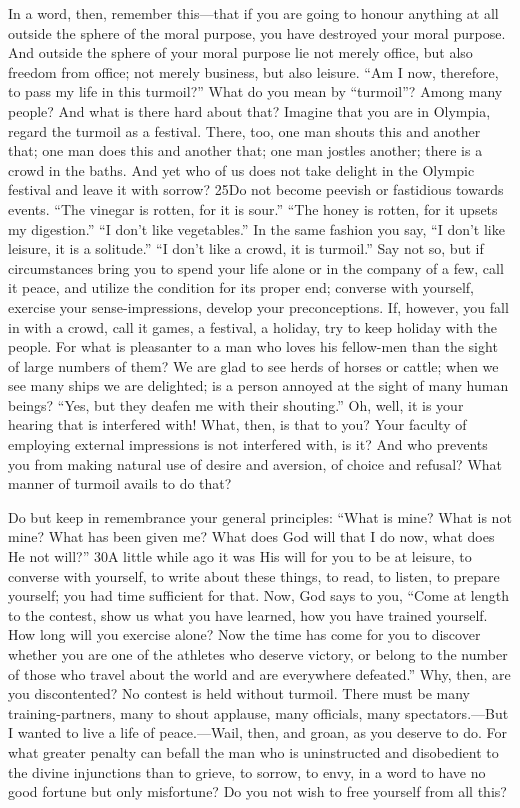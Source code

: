 In a word, then, remember this—that if you are going to honour anything at all outside the sphere of the moral purpose, you have destroyed your moral purpose. And outside the sphere of your moral purpose lie not merely office, but also freedom from office; not merely business, but also leisure. ``Am I now, therefore, to pass my life in this turmoil?'' What do you mean by ``turmoil''? Among many people? And what is there hard about that? Imagine that you are in Olympia, regard the turmoil as a festival. There, too, one man shouts this and another that; one man does this and another that; one man jostles another; there is a crowd in the baths. And yet who of us does not take delight in the Olympic festival and leave it with sorrow? 25Do not become peevish or fastidious towards events. ``The vinegar is rotten, for it is sour.'' ``The honey is rotten, for it upsets my digestion.'' ``I don't like vegetables.'' In the same fashion you say, ``I don't like leisure, it is a solitude.'' ``I don't like a crowd, it is turmoil.'' Say not so, but if circumstances bring you to spend your life alone or in the company of a few, call it peace, and utilize the condition for its proper end; converse with yourself, exercise your sense-impressions, develop your preconceptions. If, however, you fall in with a crowd, call it games, a festival, a holiday, try to keep holiday with the people. For what is pleasanter to a man who loves his fellow-men than the sight of large numbers of them? We are glad to see herds of horses or cattle; when we see many ships we are delighted; is a person annoyed at the sight of many human beings? ``Yes, but they deafen me with their shouting.'' Oh, well, it is your hearing that is interfered with! What, then, is that to you? Your faculty of employing external impressions is not interfered with, is it? And who prevents you from making natural use of desire and aversion, of choice and refusal? What manner of turmoil avails to do that?

Do but keep in remembrance your general principles: ``What is mine? What is not mine? What has been given me? What does God will that I do now, what does He not will?'' 30A little while ago it was His will for you to be at leisure, to converse with yourself, to write about these things, to read, to listen, to prepare yourself; you had time sufficient for that. Now, God says to you, ``Come at length to the contest, show us what you have learned, how you have trained yourself. How long will you exercise alone? Now the time has come for you to discover whether you are one of the athletes who deserve victory, or belong to the number of those who travel about the world and are everywhere defeated.'' Why, then, are you discontented? No contest is held without turmoil. There must be many training-partners, many to shout applause, many officials, many spectators.—But I wanted to live a life of peace.—Wail, then, and groan, as you deserve to do. For what greater penalty can befall the man who is uninstructed and disobedient to the divine injunctions than to grieve, to sorrow, to envy, in a word to have no good fortune but only misfortune? Do you not wish to free yourself from all this?

